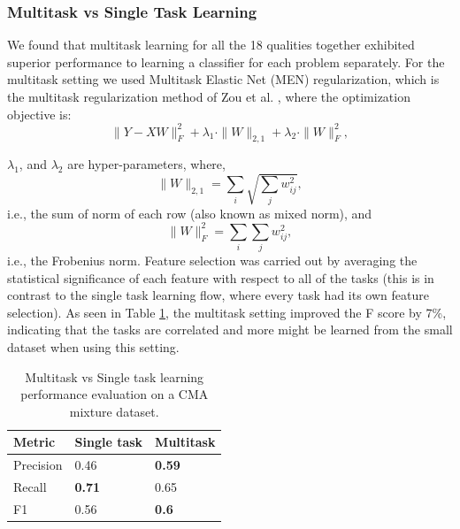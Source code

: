 \documentclass[11pt,twocolumn,varwidth=true,a4paper,fleqn]{article}
\begin{document}
\subsubsection{Multitask vs Single Task Learning}
We found that multitask learning for all the 18 qualities together exhibited superior 
performance to learning a classifier for each problem separately. For the
multitask setting we used Multitask Elastic Net (MEN) regularization, which is
the multitask regularization method of Zou et al. \cite{Zou}, where the
optimization objective is:
\\
\begin{equation}\label{eq:MEN}
	\|Y - XW\|^2_F+\lambda_1\cdot\|W\|_{2,1}+\lambda_2\cdot\|W\|^2_F,
\end{equation}    
  
$\lambda_1$, and $\lambda_2$ are hyper-parameters, where,
\\
\begin{equation*}
        \|W\|_{2,1} = \sum_i \sqrt{\sum_j w_{ij}^2},
\end{equation*} 
    i.e., the sum of norm of each row (also known as mixed norm), and 
\begin{equation*}
        \|W\|^2_F = \sum_i{\sum_j w_{ij}^2},
\end{equation*}     
	i.e., the Frobenius norm. 
Feature selection was carried out by averaging the statistical significance of
each feature with respect to all of the tasks (this is in contrast to the single
task learning flow, where every task had its own feature selection). As seen in
Table \ref{MultitaskVsSeparated}, the multitask setting improved the F score by
7\%, indicating that the tasks are correlated and more might be learned
from the small dataset when using this setting.	
 	\begin{table}[ht]
	  	\centering
		\begin{tabular}{|p{1.8cm}|p{1.8cm}|p{1.8cm}|}
		\hline
		Metric&Single task&Multitask\\\hline
		Precision&0.46&\textbf{0.59}\\\hline
		Recall&\textbf{0.71}&0.65\\\hline
		F1&0.56&\textbf{0.6}\\\hline
		\end{tabular}
		\caption{Multitask vs Single task learning performance evaluation on a CMA mixture
		dataset.}
	   \label{MultitaskVsSeparated}
	\end{table}
\end{document}
